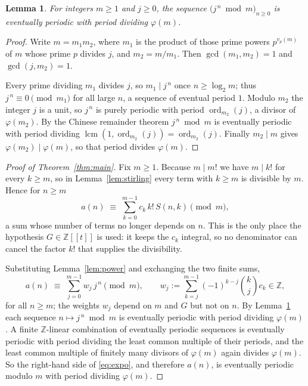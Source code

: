 \documentclass[11pt,a4paper]{article}
\theoremstyle{plain}
\newtheorem{lemma}[theorem]{Lemma}
\theoremstyle{definition}
\newcommand{\ord}{\operatorname{ord}}
\newcommand{\Z}{\mathbb{Z}}
\begin{document}
\begin{lemma}\label{lem:jn}
For integers $m\ge1$ and $j\ge0$, the sequence $\bigl(j^{\,n}\bmod m\bigr)_{n\ge0}$ is
eventually periodic with period dividing $\varphi(m)$.
\end{lemma}

\begin{proof}
Write $m=m_{1}m_{2}$, where $m_{1}$ is the product of those prime powers $p^{v_{p}(m)}$ of
$m$ whose prime $p$ divides $j$, and $m_{2}=m/m_{1}$. Then $\gcd(m_{1},m_{2})=1$ and
$\gcd(j,m_{2})=1$.

Every prime dividing $m_{1}$ divides $j$, so $m_{1}\mid j^{\,n}$ once $n\ge\log_{2}m$;
thus $j^{\,n}\equiv0 \pmod{m_{1}}$ for all large $n$, a sequence of eventual period $1$.
Modulo $m_{2}$ the integer $j$ is a unit, so $j^{\,n}$ is purely periodic with period
$\ord_{m_{2}}(j)$, a divisor of $\varphi(m_{2})$. By the Chinese remainder theorem
$j^{\,n} \bmod m$ is eventually periodic with period dividing
$\operatorname{lcm}(1,\ord_{m_{2}}(j))=\ord_{m_{2}}(j)$. Finally $m_{2}\mid m$ gives
$\varphi(m_{2})\mid\varphi(m)$, so that period divides $\varphi(m)$.
\end{proof}

\begin{proof}[Proof of Theorem~\ref{thm:main}]
Fix $m\ge1$. Because $m\mid m!$ we have $m\mid k!$ for every $k\ge m$, so in
Lemma~\ref{lem:stirling} every term with $k\ge m$ is divisible by $m$. Hence for $n\ge m$
\begin{equation}\label{eq:trunc}
a(n)\;\equiv\;\sum_{k=0}^{m-1}c_{k}\,k!\,S(n,k) \pmod m ,
\end{equation}
a sum whose number of terms no longer depends on $n$. This is the only place the
hypothesis $G\in\Z[[t]]$ is used: it keeps the $c_{k}$ integral, so no denominator can
cancel the factor $k!$ that supplies the divisibility.

Substituting Lemma~\ref{lem:power} and exchanging the two finite sums,
\begin{equation}\label{eq:expo}
a(n)\;\equiv\;\sum_{j=0}^{m-1}w_{j}\,j^{\,n} \pmod m ,
\qquad
w_{j}:=\sum_{k=j}^{m-1}(-1)^{k-j}\binom{k}{j}c_{k}\in\Z ,
\end{equation}
for all $n\ge m$; the weights $w_{j}$ depend on $m$ and $G$ but not on $n$. By
Lemma~\ref{lem:jn} each sequence $n\mapsto j^{\,n}\bmod m$ is eventually periodic with
period dividing $\varphi(m)$. A finite $\Z$-linear combination of eventually periodic
sequences is eventually periodic with period dividing the least common multiple of their
periods, and the least common multiple of finitely many divisors of $\varphi(m)$ again
divides $\varphi(m)$. So the right-hand side of \eqref{eq:expo}, and therefore $a(n)$, is
eventually periodic modulo $m$ with period dividing $\varphi(m)$.
\end{proof}
\end{document}
